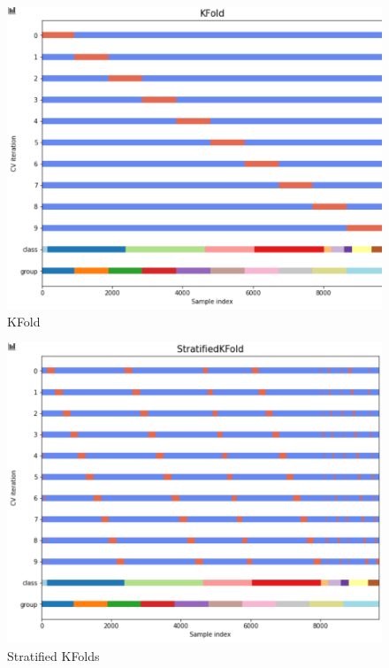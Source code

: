 \documentclass[11pt]{article}
\begin{document}
\begin{appendices}
\begin{figure}[h]
  \caption {KFold} \label{KFoldVisualised}
  \centering 
  \includegraphics[width = \textwidth, height = 0.5\textwidth, keepaspectratio]{Images/KFold.png}
\end{figure}

\begin{figure}[h]
  \caption {Stratified KFolds} \label{StratKFold}
  \centering 
  \includegraphics[width = \textwidth, height = 0.5\textwidth, keepaspectratio]{Images/StratKFold.png}
\end{figure}
\FloatBarrier
\end{appendices}

\newpage
\raggedright
\nocite{zhaoComparisonDecisionTree2008}


\end{document}

